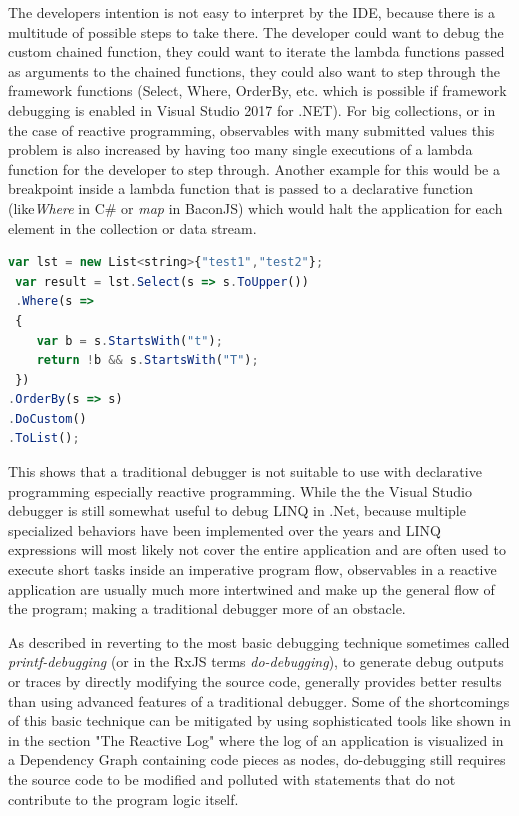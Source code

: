 The developers intention is not easy to interpret by the IDE, because there is a multitude of possible steps to take there. The developer could want to debug the custom chained function, they could want to iterate the lambda functions passed as arguments to the chained functions, they could also want to step through the framework functions (Select, Where, OrderBy, etc. which is possible if framework debugging is enabled in Visual Studio 2017 for .NET). 
For big collections, or in the case of reactive programming, observables with many submitted values this problem is also increased by having too many single executions of a lambda function for the developer to step through. Another example for this would be a breakpoint inside a lambda function that is passed to a declarative function (like\emph{Where} in C\# or \emph{map} in BaconJS) which would halt the application for each element in the collection or data stream.

\begin{lstlisting}[language=JavaScript, caption={Simple example of .NET LINQ in C\# to show the steps the Visual Studio 2017 for .NET debugger takes while debugging step-by-step.},label={lst:CSharp_LINQ}]
 var lst = new List<string>{"test1","test2"};
 var result = lst.Select(s => s.ToUpper())
 .Where(s =>
 {
	var b = s.StartsWith("t");
	return !b && s.StartsWith("T");
 })
.OrderBy(s => s)
.DoCustom()
.ToList();
\end{lstlisting}


This shows that a traditional debugger is not suitable to use with declarative programming especially reactive programming. While the the Visual Studio debugger is still somewhat useful to debug LINQ in .Net, because multiple specialized behaviors have been implemented over the years and LINQ expressions will most likely not cover the entire application and are often used to execute short tasks inside an imperative program flow, observables in a reactive application are usually much more intertwined and make up the general flow of the program; making a traditional debugger more of an obstacle.

As described in \cite{MSDN_DebugginObservables} reverting to the most basic debugging technique sometimes called \emph{printf-debugging} (or in the RxJS terms \emph{do-debugging}), to generate debug outputs or traces by directly modifying the source code, generally provides better results than using advanced features of a traditional debugger.
Some of the shortcomings of this basic technique can be mitigated by using sophisticated tools like shown in \cite{ShinyGraphFromLog} in the section "The Reactive Log" where the log of an application is visualized in a Dependency Graph containing code pieces as nodes, do-debugging still requires the source code to be modified and polluted with statements that do not contribute to the program logic itself.

